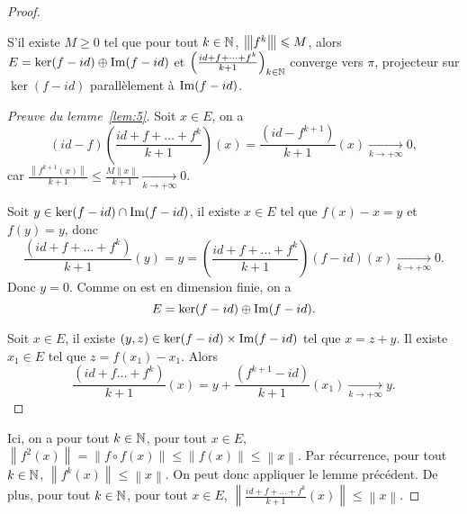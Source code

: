 \documentclass[12pt]{article}
\begin{document}
\begin{proof}
	\begin{lemma}
		\label{lem:5}
		S'il existe $M\geqslant0$ tel que pour tout $k\in\mathbb{N}$, ${\left\vert\kern-0.25ex\left\vert\kern-0.25ex\left\vert{}f^{k} \right\vert\kern-0.25ex\right\vert\kern-0.25ex\right\vert}\leqslant M$, alors $E=\ker(f-id)\oplus\mathrm{Im}(f-id)$ et $\left(\frac{id+f+\dots+f^{k}}{k+1}\right)_{k\in\mathbb{N}}$ converge vers $\pi$, projecteur sur $\ker(f-id)$ parallèlement à $\mathrm{Im}(f-id)$.
	\end{lemma}
	\begin{proof}[Preuve du lemme~\ref{lem:5}]
		Soit $x\in E$, on a 
		\begin{equation}
			(id-f)\left(\frac{id+f+\dots+f^{k}}{k+1}\right)(x)=\frac{(id-f^{k+1})}{k+1}(x)\xrightarrow[k\to+\infty]{}0,
		\end{equation}
		car $\frac{\left\lVert f^{k+1}(x)\right\rVert}{k+1}\leqslant\frac{M\left\lVert x\right\rVert}{k+1}\xrightarrow[k\to+\infty]{}0$.

		Soit $y\in\ker(f-id)\cap\mathrm{Im}(f-id)$, il existe $x\in E$ tel que $f(x)-x=y$ et $f(y)=y$, donc 
		\begin{equation}
			\frac{(id+f+\dots+f^{k})}{k+1}(y)=y=\left(\frac{id+f+\dots+f^{k}}{k+1}\right)(f-id)(x)\xrightarrow[k\to+\infty]{}0.
		\end{equation}
		Donc $y=0$. Comme on est en dimension finie, on a 
		\begin{equation}
			E=\ker(f-id)\oplus\mathrm{Im}(f-id).
		\end{equation}

		Soit $x\in E$, il existe $(y,z)\in\ker(f-id)\times\mathrm{Im}(f-id)$ tel que $x=z+y$. Il existe $x_1\in E$ tel que $z=f(x_1)-x_1$. Alors 
		\begin{equation}
			\frac{(id+f\dots+f^{k})}{k+1}(x)=y+\frac{(f^{k+1}-id)}{k+1}(x_1)\xrightarrow[k\to+\infty]{}y.
		\end{equation}
	\end{proof}
	
	Ici, on a pour tout $k\in\mathbb{N}$, pour tout $x\in E$, $\left\lVert f^{2}(x)\right\rVert=\left\lVert f\circ f(x)\right\rVert\leqslant\left\lVert f(x)\right\rVert\leqslant\left\lVert x\right\rVert$. Par récurrence, pour tout $k\in\mathbb{N}$, $\left\lVert f^{k}(x)\right\rVert\leqslant\left\lVert x\right\rVert$. On peut donc appliquer le lemme précédent. De plus, pour tout $k\in\mathbb{N}$, pour tout $x\in E$, $\left\lVert\frac{id+f+\dots+f^{k}}{k+1}(x)\right\rVert\leqslant\left\lVert x\right\rVert$.


\end{proof}
\end{document}
